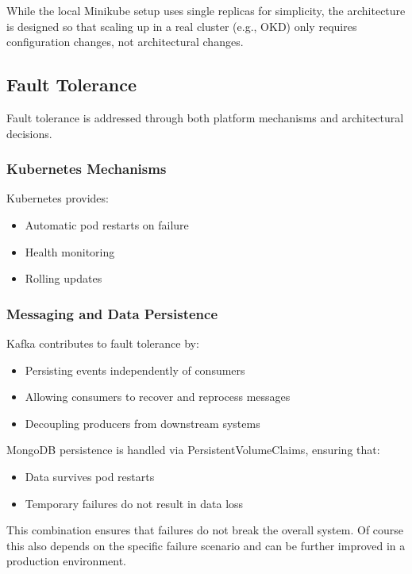 \documentclass[12pt,a4paper,onecolumn,twoside]{tau-class/tau}
\begin{document}
While the local Minikube setup uses single replicas for simplicity, the architecture is designed so that scaling up in a real cluster (e.g., OKD) only requires configuration changes, not architectural changes.

\subsection{Fault Tolerance}

Fault tolerance is addressed through both platform mechanisms and architectural decisions.

\subsubsection*{Kubernetes Mechanisms}

Kubernetes provides:

\begin{itemize}
    \item Automatic pod restarts on failure
    \item Health monitoring
    \item Rolling updates
\end{itemize}

\subsubsection*{Messaging and Data Persistence}

Kafka contributes to fault tolerance by:

\begin{itemize}
    \item Persisting events independently of consumers
    \item Allowing consumers to recover and reprocess messages
    \item Decoupling producers from downstream systems
\end{itemize}

MongoDB persistence is handled via PersistentVolumeClaims, ensuring that:

\begin{itemize}
    \item Data survives pod restarts
    \item Temporary failures do not result in data loss
\end{itemize}

This combination ensures that failures do not break the overall system. Of course this also depends on the specific failure scenario and can be further improved in a production environment.
\end{document}
